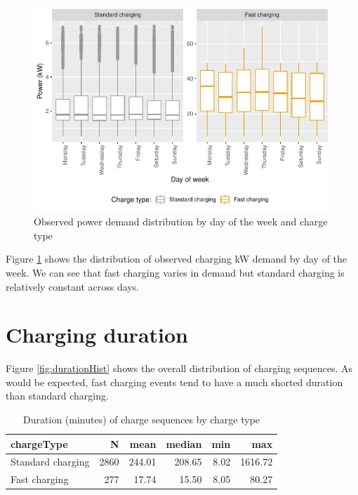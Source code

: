 \documentclass[]{article}
\begin{document}
\begin{figure}
\centering
\includegraphics{EVBB_SummaryReport_files/figure-latex/dailyPower-1.pdf}
\caption{\label{fig:dailyPower}Observed power demand distribution by day of
the week and charge type}
\end{figure}

Figure \ref{fig:dailyPower} shows the distribution of observed charging
kW demand by day of the week. We can see that fast charging varies in
demand but standard charging is relatively constant across days.

\section{Charging duration}\label{duration}

Figure \ref{fig:durationHist} shows the overall distribution of charging
sequences. As would be expected, fast charging events tend to have a
much shorted duration than standard charging.

\begin{table}[t]

\caption{\label{tab:durationDescTableReduced}Duration (minutes) of charge sequences by charge type}
\centering
\begin{tabular}{l|r|r|r|r|r}
\hline
chargeType & N & mean & median & min & max\\
\hline
Standard charging & 2860 & 244.01 & 208.65 & 8.02 & 1616.72\\
\hline
Fast charging & 277 & 17.74 & 15.50 & 8.05 & 80.27\\
\hline
\end{tabular}
\end{table}
\end{document}
